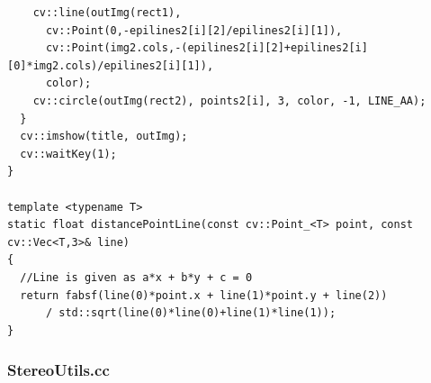 \documentclass[letterpaper,11pt]{article}
\begin{document}
\begin{verbatim}
    cv::line(outImg(rect1),
      cv::Point(0,-epilines2[i][2]/epilines2[i][1]),
      cv::Point(img2.cols,-(epilines2[i][2]+epilines2[i][0]*img2.cols)/epilines2[i][1]),
      color);
    cv::circle(outImg(rect2), points2[i], 3, color, -1, LINE_AA);
  }
  cv::imshow(title, outImg);
  cv::waitKey(1);
}
 
template <typename T>
static float distancePointLine(const cv::Point_<T> point, const cv::Vec<T,3>& line)
{
  //Line is given as a*x + b*y + c = 0
  return fabsf(line(0)*point.x + line(1)*point.y + line(2))
      / std::sqrt(line(0)*line(0)+line(1)*line(1));
}
\end{verbatim}

\subsubsection{StereoUtils.cc}
\end{document}
